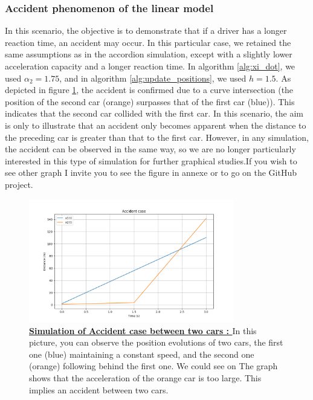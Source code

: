 \documentclass{article}
\begin{document}
		
		
		\subsubsection{Accident phenomenon of the linear model }
		
		In this scenario, the objective is to demonstrate that if a driver has a longer reaction time, an accident may occur. In this particular case, we retained the same assumptions as in the accordion simulation, except with a slightly lower acceleration capacity and a longer reaction time. In algorithm \ref{alg:xi_dot}, we used $\alpha_2=1.75$, and in algorithm \ref{alg:update_positions}, we used $h=1.5$. As depicted in figure \ref{fig:Acc1}, the accident is confirmed due to a curve intersection (the position of the second car (orange) surpasses that of the first car (blue)). This indicates that the second car collided with the first car. In this scenario, the aim is only to illustrate that an accident only becomes apparent when the distance to the preceding car is greater than that to the first car. However, in any simulation, the accident can be observed in the same way, so we are no longer particularly interested in this type of simulation for further graphical studies.If you wish to see other graph I invite you to see the figure in annexe or to go on the GitHub project.
	
		
		\begin{figure}[H]
			\centering
			\includegraphics[width=0.8\textwidth]{Acc1.png}
			\caption[Simulation of Accident case between two cars]{\textbf{\underline{Simulation of Accident case between two cars : }} In this picture, you can observe the position evolutions of two cars, the first one (blue) maintaining a constant speed, and the second one (orange) following behind the first one. We could see on The graph shows that the acceleration of the orange car is too large. This implies an accident between two cars.}
			\label{fig:Acc1}
		\end{figure}
		
\end{document}
